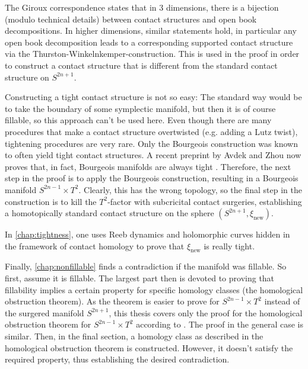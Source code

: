 The Giroux correspondence states that in 3 dimensions, there is a bijection (modulo technical details) between contact structures
and open book decompositions.
In higher dimensions, similar statements hold, in particular any open book decomposition leads to a corresponding supported
contact structure via the Thurston-Winkelnkemper-construction.
This is used in the proof in order to construct a contact structure that is different from the standard contact structure on $S^{2n+1}$.

Constructing a tight contact structure is not so easy: The standard way would be to take the boundary of some symplectic manifold,
but then it is of course fillable, so this approach can't be used here.
Even though there are many procedures that make a contact structure overtwisted (e.g. adding a Lutz twist), tightening procedures are very rare.
Only the Bourgeois construction was known to often yield tight contact structures. 
A recent preprint by Avdek and Zhou now proves that, in fact, Bourgeois manifolds are always tight \cite{AZ24}.
Therefore, the next step in the proof is to apply the Bourgeois construction, resulting in a Bourgeois manifold $S^{2n-1} \times T^2$.
Clearly, this has the wrong topology, so the final step in the construction is to kill the $T^2$-factor with
subcricital contact surgeries, establishing a homotopically standard contact structure on the sphere $(S^{2n+1},\xi_\text{new})$.

In \cref{chap:tightness}, one uses Reeb dynamics and holomorphic curves hidden in the framework of contact homology to prove that $\xi_\text{new}$
is really tight.

Finally, \cref{chap:nonfillable} finds a contradiction if the manifold was fillable. So first, assume it is fillable.
The largest part then is devoted to proving that fillability implies a certain property for specific homology classes
(the homological obstruction theorem).
As the theorem is easier to prove for $S^{2n-1} \times T^2$ instead of the surgered manifold $S^{2n+1}$,
this thesis covers only the proof for the homological obstruction theorem for $S^{2n-1} \times T^2$ according to \cite{BGM22}. 
The proof in the general case is similar.
Then, in the final section, a homology class as described in the homological obstruction theorem is constructed.
However, it doesn't satisfy the required property, thus establishing the desired contradiction.